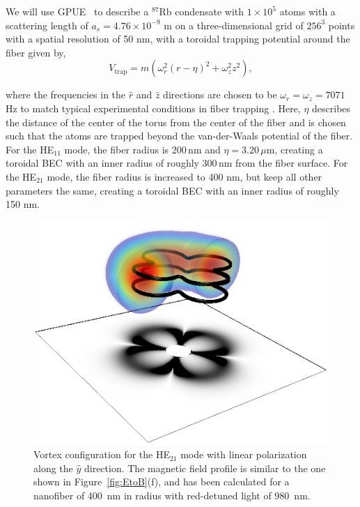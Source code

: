 We will use GPUE~\cite{schloss2018} to describe a $^{87}$Rb condensate with $1\times10^5$ atoms with a scattering length of $a_s=4.76 \times 10^{-9}$ m on a three-dimensional grid of $256^3$ points with a spatial resolution of 50 nm, with a toroidal trapping potential around the fiber given by,
\begin{equation}
V_\text{trap} = m(\omega_r^2(r-\eta)^2 + \omega_z^2z^2),
\label{eqn:potential}
\end{equation}

\noindent where the frequencies in the $\hat r$ and $\hat z$ directions are chosen to be $\omega_r = \omega_z = 7071$Hz to match typical experimental conditions in fiber trapping \cite{vetsch2010}.
Here, $\eta$ describes the distance of the center of the torus from the center of the fiber and is chosen such that the atoms are trapped beyond the van-der-Waals potential of the fiber.
For the HE$_{11}$ mode, the fiber radius is 200\,nm and $\eta = 3.20$\,$\mu$m, creating a toroidal BEC with an inner radius of roughly 300\,nm from the fiber surface.
For the HE$_{21}$ mode, the fiber radius is increased to 400 nm, but keep all other parameters the same, creating a toroidal BEC with an inner radius of roughly 150 nm.

\begin{figure}[tb]
\center \includegraphics[width=0.5\linewidth]{data/3d/HE21_3d.png}
 
 \caption{Vortex configuration for the HE$_{21}$ mode with linear polarization along the $\hat y$ direction.
\label{eqn:potential}
The magnetic field profile is similar to the one shown in Figure~\ref{fig:EtoB}(f), and has been calculated for a nanofiber of 400~nm in radius with red-detuned light of 980~nm.}
 \label{fig:HE21_3d}
\end{figure}

